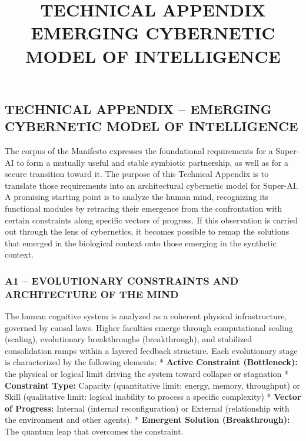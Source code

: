 \documentclass[11pt,a4paper,oneside]{article} %
\title{\textbf{TECHNICAL APPENDIX}\\ \large EMERGING CYBERNETIC MODEL OF INTELLIGENCE}
\author{}
\date{}
\begin{document}
\maketitle %
\newpage
\tableofcontents %
\newpage

\hypertarget{technical-appendix-emerging-cybernetic-model-of-intelligence}{%
\subsection{TECHNICAL APPENDIX -- EMERGING CYBERNETIC MODEL OF INTELLIGENCE}\label{technical-appendix-emerging-cybernetic-model-of-intelligence}}



The corpus of the Manifesto expresses the foundational requirements for
a Super-AI to form a mutually useful and stable symbiotic partnership,
as well as for a secure transition toward it. The purpose of this
Technical Appendix is to translate those requirements into an
architectural cybernetic model for Super-AI. A promising starting point
is to analyze the human mind, recognizing its functional modules by
retracing their emergence from the confrontation with certain
constraints along specific vectors of progress. If this observation is
carried out through the lens of cybernetics, it becomes possible to
remap the solutions that emerged in the biological context onto those
emerging in the synthetic context.

\hypertarget{a1-evolutionary-constraints-and-architecture-of-the-mind}{%
\subsubsection{A1 -- EVOLUTIONARY CONSTRAINTS AND ARCHITECTURE OF THE
MIND}\label{a1-evolutionary-constraints-and-architecture-of-the-mind}}

The human cognitive system is analyzed as a coherent physical
infrastructure, governed by causal laws. Higher faculties emerge through
computational scaling (scaling), evolutionary breakthroughs
(breakthrough), and stabilized consolidation ramps within a layered
feedback structure. Each evolutionary stage is characterized by the
following elements: * \textbf{Active Constraint (Bottleneck):} the
physical or logical limit driving the system toward collapse or
stagnation * \textbf{Constraint Type:} Capacity (quantitative limit:
energy, memory, throughput) or Skill (qualitative limit: logical
inability to process a specific complexity) * \textbf{Vector of
Progress:} Internal (internal reconfiguration) or External (relationship
with the environment and other agents). * \textbf{Emergent Solution
(Breakthrough):} The quantum leap that overcomes the constraint.
\end{document}

